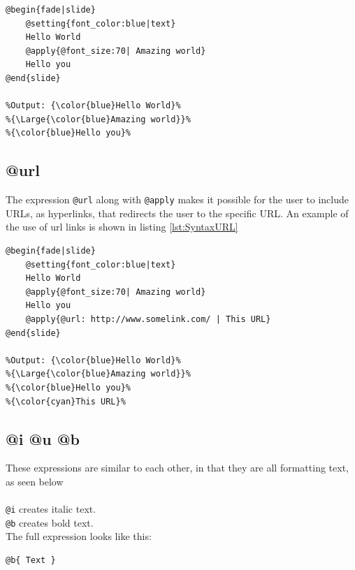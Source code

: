 {\begin{lstlisting}[frame=single, caption=Hello World with apply, label=lst:SyntaxApply]
@begin{fade|slide}
    @setting{font_color:blue|text}
    Hello World
    @apply{@font_size:70| Amazing world}
    Hello you
@end{slide}

%Output: {\color{blue}Hello World}%
%{\Large{\color{blue}Amazing world}}%
%{\color{blue}Hello you}%
\end{lstlisting}

\subsection{@url}
The expression \texttt{@url} along with \texttt{@apply} makes it possible for the user to include URLs, as hyperlinks, that redirects the user to the specific URL.
An example of the use of url links is shown in listing \ref{lst:SyntaxURL}

\begin{lstlisting}[frame=single, caption=Hello World with an URL, label=lst:SyntaxURL]
@begin{fade|slide}
    @setting{font_color:blue|text}
    Hello World
    @apply{@font_size:70| Amazing world}
    Hello you
    @apply{@url: http://www.somelink.com/ | This URL}
@end{slide}

%Output: {\color{blue}Hello World}%
%{\Large{\color{blue}Amazing world}}%
%{\color{blue}Hello you}%
%{\color{cyan}This URL}%
\end{lstlisting}

\subsection{@i @u @b}
These expressions are similar to each other, in that they are all formatting text, as seen below \\

 \\
\texttt{@i} creates italic text. \\
\texttt{@b} creates bold text. \\
The full expression looks like this:
\begin{lstlisting}[frame=single]
@b{ Text }
\end{lstlisting}


}
